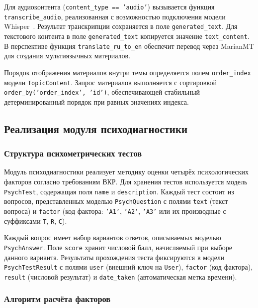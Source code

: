 Для аудиоконтента (\texttt{content\_type == 'audio'}) вызывается 
функция \texttt{transcribe\_audio}, реализованная с возможностью 
подключения модели Whisper~\cite{woolf2009building}. 
Результат транскрипции сохраняется в поле \texttt{generated\_text}. 
Для текстового контента в поле \texttt{generated\_text} копируется 
значение \texttt{text\_content}. В перспективе функция 
\texttt{translate\_ru\_to\_en} обеспечит перевод через MarianMT 
для создания мультиязычных материалов.

Порядок отображения материалов внутри темы определяется полем 
\texttt{order\_index} модели \texttt{TopicContent}. Запрос материалов 
выполняется с сортировкой \texttt{order\_by('order\_index', 'id')}, 
обеспечивающей стабильный детерминированный порядок при равных 
значениях индекса.

\subsection{Реализация модуля психодиагностики}
\label{subsec:psychodiagnostics_module}

\subsubsection{Структура психометрических тестов}

Модуль психодиагностики реализует методику оценки четырёх 
психологических факторов согласно требованиям ВКР. Для хранения тестов 
используется модель \texttt{PsychTest}, содержащая поля \texttt{name} 
и \texttt{description}. Каждый тест состоит из вопросов, представленных 
моделью \texttt{PsychQuestion} с полями \texttt{text} (текст вопроса) и 
\texttt{factor} (код фактора: \texttt{'A1'}, \texttt{'A2'}, \texttt{'A3'} 
или их производные с суффиксами \texttt{T}, \texttt{R}, \texttt{C}).

Каждый вопрос имеет набор вариантов ответов, описываемых моделью 
\texttt{PsychAnswer}. Поле \texttt{score} хранит числовой балл, 
начисляемый при выборе данного варианта. Результаты прохождения теста 
фиксируются в модели \texttt{PsychTestResult} с полями \texttt{user} 
(внешний ключ на \texttt{User}), \texttt{factor} (код фактора), 
\texttt{result} (числовой результат) и \texttt{date\_taken} 
(автоматическая метка времени).

\subsubsection{Алгоритм расчёта факторов}

